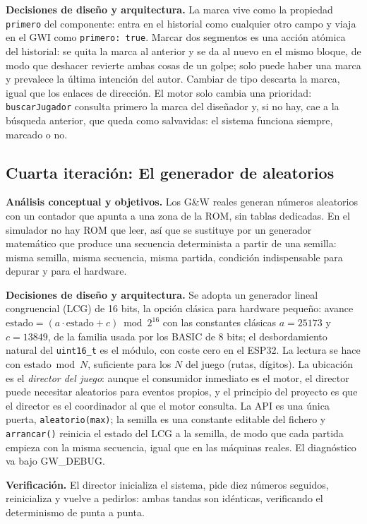\textbf{Decisiones de diseño y arquitectura.} La marca vive como la
propiedad \texttt{primero} del componente: entra en el historial como
cualquier otro campo y viaja en el GWI como
\texttt{primero: true}. Marcar dos segmentos es una acción atómica del
historial: se quita la marca al anterior y se da al nuevo en el mismo
bloque, de modo que deshacer revierte ambas cosas de un golpe; solo
puede haber una marca y prevalece la última intención del autor.
Cambiar de tipo descarta la marca, igual que los enlaces de dirección.
El motor solo cambia una prioridad: \texttt{buscarJugador} consulta
primero la marca del diseñador y, si no hay, cae a la búsqueda
anterior, que queda como salvavidas: el sistema funciona siempre,
marcado o no.

\subsection{Cuarta iteración: El generador de aleatorios}
\label{sec:F3PRNG}

\textbf{Análisis conceptual y objetivos.} Los G\&W reales generan
números aleatorios con un contador que apunta a una zona de la ROM, sin
tablas dedicadas. En el simulador no hay ROM que leer, así que se
sustituye por un generador matemático que produce una secuencia
determinista a partir de una semilla: misma semilla, misma secuencia,
misma partida, condición indispensable para depurar y para el
hardware.

\textbf{Decisiones de diseño y arquitectura.} Se adopta un generador
lineal congruencial (LCG) de 16 bits, la opción clásica para hardware
pequeño: avance $\text{estado} = (a \cdot \text{estado} + c)
\bmod 2^{16}$ con las constantes clásicas $a = 25173$ y $c = 13849$, de
la familia usada por los BASIC de 8 bits; el desbordamiento natural del
\texttt{uint16\_t} es el módulo, con coste cero en el ESP32. La lectura
se hace con $\text{estado} \bmod N$, suficiente para los $N$ del juego
(rutas, dígitos). La ubicación es el \emph{director del juego}: aunque el
consumidor inmediato es el motor, el director puede necesitar aleatorios
para eventos propios, y el principio del proyecto es que el director es
el coordinador al que el motor consulta. La API es una única puerta,
\texttt{aleatorio(max)}; la semilla es una constante editable del
fichero y \texttt{arrancar()} reinicia el estado del LCG a la semilla,
de modo que cada partida empieza con la misma secuencia, igual que en
las máquinas reales. El diagnóstico va bajo GW\_DEBUG.

\textbf{Verificación.} El director inicializa el sistema, pide diez
números seguidos, reinicializa y vuelve a pedirlos: ambas tandas son
idénticas, verificando el determinismo de punta a punta.


